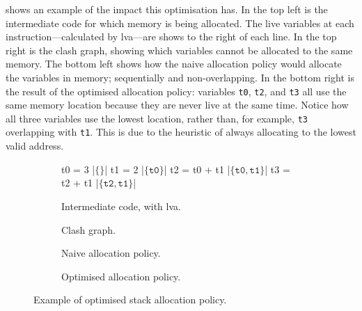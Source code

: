 \documentclass[00-main.tex]{subfiles}
\begin{document}
 shows an example of the impact this optimisation has.
In the top left is the intermediate code for which memory is being allocated.
The live variables at each instruction---calculated by \gls{lva}---are shows to the right of each line.
In the top right is the clash graph, showing which variables cannot be allocated to the same memory.
The bottom left shows how the naive allocation policy would allocate the variables in memory; sequentially and non-overlapping.
In the bottom right is the result of the optimised allocation policy: variables \texttt{t0}, \texttt{t2}, and \texttt{t3} all use the same memory location because they are never live at the same time.
Notice how all three variables use the lowest location, rather than, for example, \texttt{t3} overlapping with \texttt{t1}.
This is due to the heuristic of always allocating to the lowest valid address.

\begin{figure}[ht]
  \begin{subfigure}[b]{0.5\textwidth}
    \begin{IrCodeListing}
    t0 = 3                 |$\{ \}$|
    t1 = 2                 |$\{ \texttt{t0} \}$|
    t2 = t0 + t1           |$\{ \texttt{t0}, \texttt{t1} \}$|
    t3 = t2 + t1           |$\{ \texttt{t2}, \texttt{t1} \}$|
    \end{IrCodeListing}
    \caption{Intermediate code, with \acrlong{lva}.}
  \end{subfigure}
  \begin{subfigure}[b]{0.5\textwidth}
    \centering
    \caption{Clash graph.}
  \end{subfigure}
  \par\bigskip
  \begin{subfigure}[b]{0.5\textwidth}
    \caption{Naive allocation policy.}
  \end{subfigure}
  \begin{subfigure}[b]{0.5\textwidth}
    \caption{Optimised allocation policy.}
  \end{subfigure}
  \caption{Example of optimised stack allocation policy.}
  \label{fig:optimised var allocation example} %
\end{figure}
\end{document}
